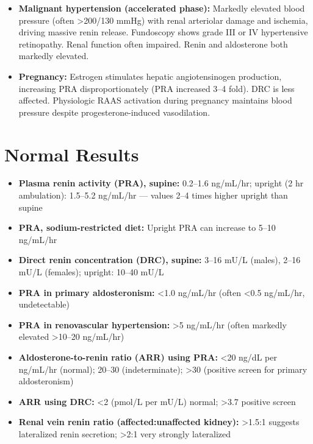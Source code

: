 \begin{itemize}
  \item \textbf{Malignant hypertension (accelerated phase):} Markedly elevated blood pressure (often >200/130 mmHg) with renal arteriolar damage and ischemia, driving massive renin release. Fundoscopy shows grade III or IV hypertensive retinopathy. Renal function often impaired. Renin and aldosterone both markedly elevated.
  \item \textbf{Pregnancy:} Estrogen stimulates hepatic angiotensinogen production, increasing PRA disproportionately (PRA increased 3--4 fold). DRC is less affected. Physiologic RAAS activation during pregnancy maintains blood pressure despite progesterone-induced vasodilation.
\end{itemize}

\section*{Normal Results}
\begin{itemize}
  \item \textbf{Plasma renin activity (PRA), supine:} 0.2--1.6 ng/mL/hr; upright (2 hr ambulation): 1.5--5.2 ng/mL/hr --- values 2--4 times higher upright than supine
  \item \textbf{PRA, sodium-restricted diet:} Upright PRA can increase to 5--10 ng/mL/hr
  \item \textbf{Direct renin concentration (DRC), supine:} 3--16 mU/L (males), 2--16 mU/L (females); upright: 10--40 mU/L
  \item \textbf{PRA in primary aldosteronism:} <1.0 ng/mL/hr (often <0.5 ng/mL/hr, undetectable)
  \item \textbf{PRA in renovascular hypertension:} >5 ng/mL/hr (often markedly elevated >10--20 ng/mL/hr)
  \item \textbf{Aldosterone-to-renin ratio (ARR) using PRA:} <20 ng/dL per ng/mL/hr (normal); 20--30 (indeterminate); >30 (positive screen for primary aldosteronism)
  \item \textbf{ARR using DRC:} <2 (pmol/L per mU/L) normal; >3.7 positive screen
  \item \textbf{Renal vein renin ratio (affected:unaffected kidney):} >1.5:1 suggests lateralized renin secretion; >2:1 very strongly lateralized
\end{itemize}

